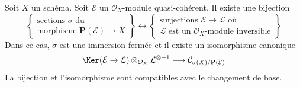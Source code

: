 \begin{lemma}
\label{lemma-conormal-sheaf-section-projective-bundle}
Soit  $X$  un schéma. Soit  $\mathcal{E}$  un  $\mathcal{O}_X$-module
quasi-cohérent. Il existe une bijection
$$
\left\{
\begin{matrix}
\text{sections }\sigma\text{ du } \\
\text{morphisme } \mathbf{P}(\mathcal{E}) \to X
\end{matrix}
\right\}
\leftrightarrow
\left\{
\begin{matrix}
\text{surjections }\mathcal{E} \to \mathcal{L}\text{ où} \\
\mathcal{L}\text{ est un }\mathcal{O}_X\text{-module inversible}
\end{matrix}
\right\}
$$
Dans ce cas,  $\sigma$  est une immersion fermée et il existe un isomorphisme
canonique
$$
\Ker(\mathcal{E} \to \mathcal{L})
\otimes_{\mathcal{O}_X} \mathcal{L}^{\otimes -1}
\longrightarrow
\mathcal{C}_{\sigma(X)/\mathbf{P}(\mathcal{E})}
$$
La bijection et l'isomorphisme sont compatibles avec le changement de base.
\end{lemma}

